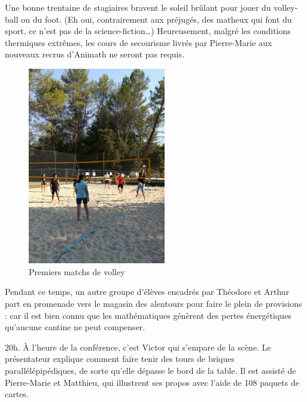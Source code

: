 Une bonne trentaine de stagiaires bravent le soleil brûlant pour jouer du volley-ball ou du foot. (Eh oui, contrairement aux préjugés, des matheux qui font du sport, ce n’est pas de la science-fiction…) Heureusement, malgré les conditions thermiques extrêmes, les cours de secourisme livrés par Pierre-Marie aux nouveaux recrus d’Animath ne seront pas requis.

\begin{figure}[H]
\centering\includegraphics[width=6cm]{CR-17-2.jpg}
\caption{Premiers matchs de volley}
\end{figure}

Pendant ce temps, un autre groupe d’élèves encadrés par Théodore et Arthur part en promenade vers le magasin des alentours pour faire le plein de provisions : car il est bien connu que les mathématiques génèrent des pertes énergétiques qu’aucune cantine ne peut compenser.

20h. À l’heure de la conférence, c’est Victor qui s’empare de la scène. Le présentateur explique comment faire tenir des tours de briques parallélépipédiques, de sorte qu’elle dépasse le bord de la table. Il est assisté de Pierre-Marie et Matthieu, qui illustrent ses propos avec l’aide de 108 paquets de cartes.


